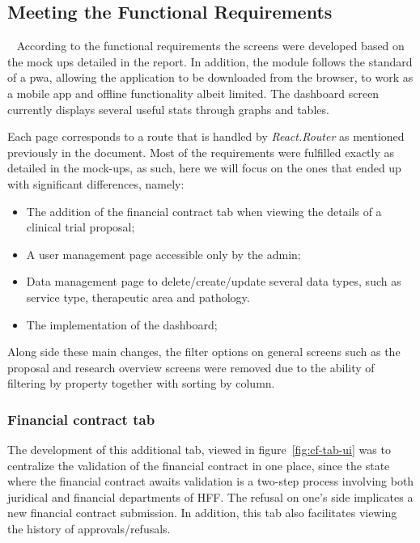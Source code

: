 \subsection{Meeting the Functional Requirements}~\label{ch:impl:sec:fe:subsec:meeting-reqs}
According to the functional requirements the screens were developed based on the mock ups detailed in the report. In addition, the module follows the standard of a \acrfull{pwa}, allowing the application to be downloaded from the browser, to work as a mobile app and offline functionality albeit limited. The dashboard screen currently displays several useful stats through graphs and tables.

Each page corresponds to a route that is handled by \textit{React.Router} as mentioned previously in the document.
Most of the requirements were fulfilled exactly as detailed in the mock-ups, as such, here we will focus on the ones that ended up with significant differences, namely:

\begin{itemize}
    \item The addition of the financial contract tab when viewing the details of a clinical trial proposal;
    \item A user management page accessible only by the admin;
    \item Data management page to delete/create/update several data types, such as service type, therapeutic area and pathology.
    \item The implementation of the dashboard;
\end{itemize}

Along side these main changes, the filter options on general screens such as the proposal and research overview screens were removed due to the ability of filtering by property together with sorting by column.

\subsubsection{Financial contract tab}

The development of this additional tab, viewed in figure~\ref{fig:cf-tab-ui} was to centralize the validation of the financial contract in one place, since the state where the financial contract awaits validation is a two-step process involving both juridical and financial departments of HFF. The refusal on one's side implicates a new financial contract submission. In addition, this tab also facilitates viewing the history of approvals/refusals.

